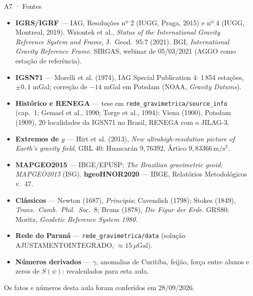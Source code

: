 \documentclass[aspectratio=169,11pt]{beamer}
\newcommand{\uGal}{\ensuremath{\,\mu\mathrm{Gal}}\xspace}
\newcommand{\mss}{\ensuremath{\,\mathrm{m/s^2}}\xspace}
\begin{document}
\begin{frame}{A7 · Fontes}
  \scriptsize
  \begin{itemize}
    \setlength{\itemsep}{0pt}
    \item \textbf{IGRS/IGRF} --- IAG, Resoluções nº 2 (IUGG, Praga, 2015) e nº 4 (IUGG,
          Montreal, 2019). Wziontek et al., \emph{Status of the International Gravity
          Reference System and Frame}, J.~Geod.~95:7 (2021). BGI, \emph{International Gravity
          Reference Frame}. SIRGAS, webinar de 05/03/2021 (AGGO como estação de referência).
    \item \textbf{IGSN71} --- Morelli et al. (1974), IAG Special Publication 4: 1\,854
          estações, $\pm 0{,}1$ mGal; correção de $-14$ mGal em Potsdam (NOAA, \emph{Gravity
          Datums}).
    \item \textbf{Histórico e RENEGA} --- tese em \texttt{rede\_gravimetrica/source\_info}
          (cap.~1; Gemael et al., 1990; Torge et al., 1994): Viena (1900), Potsdam (1909),
          20 localidades da IGSN71 no Brasil, RENEGA com o JILAG-3.
    \item \textbf{Extremos de $g$} --- Hirt et al. (2013), \emph{New ultrahigh-resolution
          picture of Earth's gravity field}, GRL 40: Huascarán $9{,}76392$, Ártico
          $9{,}83366$\mss.
    \item \textbf{MAPGEO2015} --- IBGE/EPUSP; \emph{The Brazilian gravimetric geoid:
          MAPGEO2015} (ISG). \textbf{hgeoHNOR2020} --- IBGE, Relatórios Metodológicos v.~47.
    \item \textbf{Clássicos} --- Newton (1687), \emph{Principia}; Cavendish (1798);
          Stokes (1849), \emph{Trans.~Camb.~Phil.~Soc.}~8; Bruns (1878), \emph{Die Figur der
          Erde}. GRS80: Moritz, \emph{Geodetic Reference System 1980}.
    \item \textbf{Rede do Paraná} --- \texttt{rede\_gravimetrica/data} (solução
          AJUSTAMENTOINTEGRADO, $\approx 15$\uGal).
    \item \textbf{Números derivados} --- $\gamma$, anomalias de Curitiba, feijão, força entre
          alunos e zeros de $S(\psi)$: recalculados para esta aula.
  \end{itemize}
  \smallskip
  \centering
  \footnotesize Os fatos e números desta aula foram conferidos em 28/09/2026.
\end{frame}
\end{document}
